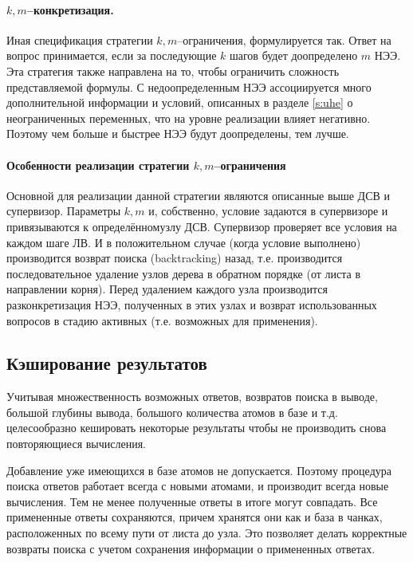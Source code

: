 \paragraph{$k,m$--конкретизация.} Иная спецификация стратегии $k,m$--ограничения, формулируется так. Ответ на вопрос принимается, если за последующие $k$ шагов будет доопределено $m$ НЭЭ. Эта стратегия также направлена на то, чтобы ограничить сложность представляемой формулы. С недоопределенным НЭЭ ассоциируется много дополнительной информации и условий, описанных в разделе \ref{s:uhe} о неограниченных переменных, что на уровне реализации влияет негативно. Поэтому чем больше и быстрее НЭЭ будут доопределены, тем лучше.

\paragraph{Особенности реализации стратегии $k,m$--ограничения}
Основной для реализации данной стратегии являются описанные выше ДСВ и супервизор. Параметры $k,m$ и, собственно, условие задаются в супервизоре и привязываются к определённомузлу ДСВ. Супервизор проверяет все условия на каждом шаге ЛВ. И в положительном случае (когда условие выполнено) производится возврат поиска (backtracking) назад, т.е. производится последовательное удаление узлов дерева в обратном порядке (от листа в направлении корня). Перед удалением каждого узла производится разконкретизация НЭЭ, полученных в этих узлах и возврат использованных вопросов в стадию активных (т.е. возможных для применения).

\subsection{Кэширование результатов}
Учитывая множественность возможных ответов, возвратов поиска в выводе, большой глубины вывода, большого количества атомов в базе и т.д. целесообразно кешировать некоторые результаты чтобы не производить снова повторяющиеся вычисления.

Добавление уже имеющихся в базе атомов не допускается. Поэтому процедура поиска ответов работает всегда с новыми атомами, и производит всегда новые вычисления. Тем не менее полученные ответы в итоге могут совпадать. Все примененные ответы сохраняются, причем хранятся они как и база в чанках, расположенных по всему пути от листа до узла. Это позволяет делать корректные возвраты поиска с учетом сохранения информации о примененных ответах.

